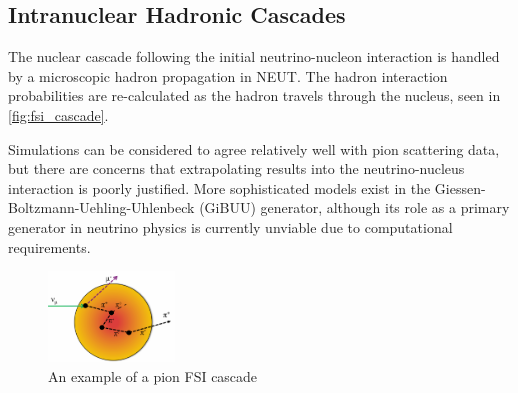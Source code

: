 \subsection{Intranuclear Hadronic Cascades}
The nuclear cascade following the initial neutrino-nucleon interaction is handled by a microscopic hadron propagation in NEUT. The hadron interaction probabilities are re-calculated as the hadron travels through the nucleus, seen in \autoref{fig:fsi_cascade}. 

Simulations can be considered to agree relatively well with pion scattering data\cite{thesis_elder}, but there are concerns that extrapolating results into the neutrino-nucleus interaction is poorly justified\cite{ulrich_review}. More sophisticated models exist in the Giessen-Boltzmann-Uehling-Uhlenbeck (GiBUU)\cite{gibuu} generator, although its role as a primary generator in neutrino physics is currently unviable due to computational requirements.
\begin{figure}[h]
	\centering
	\includegraphics[width=0.3\textwidth, trim={0mm 0mm 0mm 0mm}, clip,page=1]{figures/niwg/diagrams/cascade}
	\caption{An example of a pion FSI cascade}
	\label{fig:fsi_cascade}
\end{figure}

